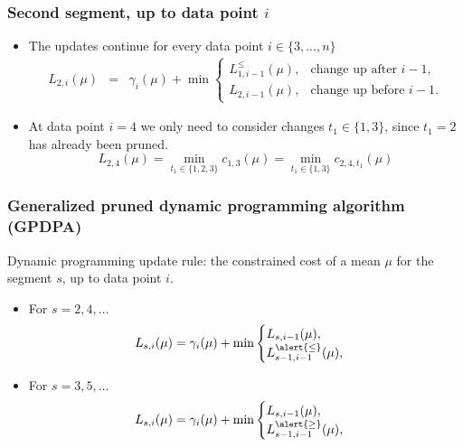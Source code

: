 \documentclass{beamer}
\begin{document}
\begin{frame}
  \frametitle{Second segment, up to data point $i$}
  \begin{itemize} 
  \item The updates continue for every data point $i\in\{3, ..., n\}$
    \begin{eqnarray*}
      L_{2,i}(\mu) &=&  \gamma_i(\mu) + \min
      \begin{cases}
        L_{1,i-1}^{\leq}(\mu), & \text{change up after $i-1$,}\\
        L_{2,i-1}(\mu), & \text{change up before $i-1$.}
      \end{cases}
    \end{eqnarray*}
  \item At data point $i=4$ we only need to consider changes $t_1\in\{1,3\}$, since $t_1=2$ has already been pruned. 
$$
L_{2,4}(\mu) = \min_{t_1\in\{1,2,3\}} c_{1,3}(\mu) = 
\min_{t_1\in\{1,3\}} c_{2,4,t_1}(\mu)
$$
      
  \end{itemize}
\end{frame}


\begin{frame}
  \frametitle{Generalized pruned dynamic programming algorithm (GPDPA)}
  Dynamic programming update rule: the constrained cost of a
  mean $\mu$ for the segment $s$, up to data point $i$.
  \begin{itemize}
  \item For $s=2, 4, \dots$
    \begin{equation*}
      L_{s,i}(\mu) = \gamma_i(\mu) + \min
      \begin{cases}
        L_{s,i-1}(\mu),\\
        L_{s-1,i-1}^{\alert{\leq}}(\mu),
      \end{cases}
    \end{equation*}
  \item For $s=3, 5, \dots$
    \begin{equation*}
      L_{s,i}(\mu) = \gamma_i(\mu) + \min
      \begin{cases}
        L_{s,i-1}(\mu),\\
        L_{s-1,i-1}^{\alert{\geq}}(\mu),
      \end{cases}
    \end{equation*}
  \end{itemize}
\end{frame}
\end{document}
